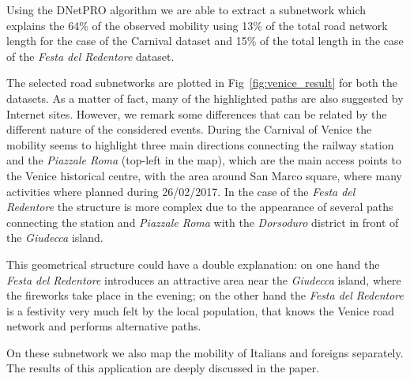 \documentclass{standalone}
\begin{document}

Using the DNetPRO algorithm we are able to extract a subnetwork which explains the 64\% of the observed mobility using 13\% of the total road network length for the case of the Carnival dataset and 15\% of the total length in the case of the \emph{Festa del Redentore} dataset.

The selected road subnetworks are plotted in Fig~\ref{fig:venice_result} for both the datasets.
As a matter of fact, many of the highlighted paths are also suggested by Internet sites.
However, we remark some differences that can be related by the different nature of the considered events.
During the Carnival of Venice the mobility seems to highlight three main directions connecting the railway station and the \emph{Piazzale Roma} (top-left in the map), which are the main access points to the Venice historical centre, with the area around San Marco square, where many activities where planned during 26/02/2017.
In the case of the \emph{Festa del Redentore} the structure is more complex due to the appearance of several paths connecting the station and \emph{Piazzale Roma} with the \emph{Dorsoduro} district in front of the \emph{Giudecca} island.

This geometrical structure could have a double explanation: on one hand the \emph{Festa del Redentore} introduces an attractive area near the \emph{Giudecca} island, where the fireworks take place in the evening; on the other hand the \emph{Festa del Redentore} is a festivity very much felt by the local population, that knows the Venice road network and performs alternative paths.

On these subnetwork we also map the mobility of Italians and foreigns separately.
The results of this application are deeply discussed in the paper.
\end{document}
